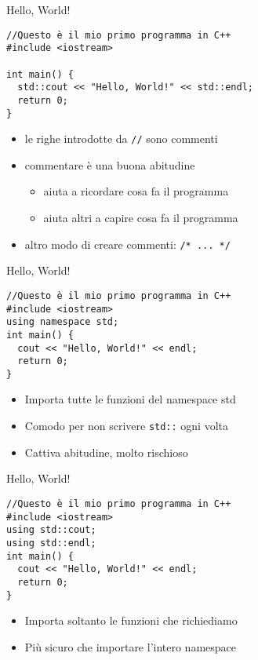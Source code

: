 \documentclass[xcolor=dvipsnames,handout]{beamer}
\begin{document}
\begin{frame}[fragile]{Hello, World!}
  \vfill
  \begin{lstlisting}
//Questo è il mio primo programma in C++
#include <iostream>

int main() {
  std::cout << "Hello, World!" << std::endl;
  return 0;
}
  \end{lstlisting}
  \vfill
  \begin{itemize}
    \item le righe introdotte da \lstinline$//$ sono \alert{commenti}
    \vfill
    \item commentare è una buona abitudine
    \begin{itemize}
      \item aiuta a ricordare cosa fa il programma
      \item aiuta altri a capire cosa fa il programma
    \end{itemize}
    \vfill
    \item altro modo di creare commenti: \lstinline$/* ... */$
  \end{itemize}
  \vfill
\end{frame}

\begin{frame}[fragile]{Hello, World!}
  \vfill
  \begin{lstlisting}
//Questo è il mio primo programma in C++
#include <iostream>
using namespace std;
int main() {
  cout << "Hello, World!" << endl;
  return 0;
}
  \end{lstlisting}
  \vfill
  \begin{itemize}
    \item Importa \alert{tutte} le funzioni del namespace std
    \vfill
    \item Comodo per non scrivere \lstinline$std::$ ogni volta
    \vfill
    \item Cattiva abitudine, molto rischioso
  \end{itemize}
  \vfill
\end{frame}

\begin{frame}[fragile]{Hello, World!}
  \vfill
  \begin{lstlisting}
//Questo è il mio primo programma in C++
#include <iostream>
using std::cout;
using std::endl;
int main() {
  cout << "Hello, World!" << endl;
  return 0;
}
  \end{lstlisting}
  \vfill
  \begin{itemize}
    \item Importa soltanto le funzioni che richiediamo
    \vfill
    \item Più sicuro che importare l'intero namespace
  \end{itemize}
  \vfill
\end{frame}
\end{document}

